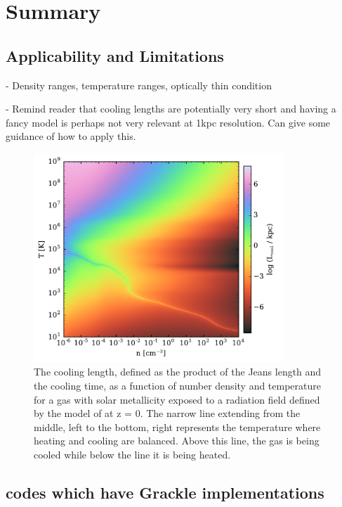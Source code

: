 \section{Summary} \label{sec:summary}

\subsection{Applicability and Limitations}

- Density ranges, temperature ranges, optically thin condition

- Remind reader that cooling lengths are potentially very short and
having a fancy model is perhaps not very relevant at 1kpc
resolution. Can give some guidance of how to apply this.

\begin{figure}
  \centering
  \includegraphics[width=0.84\textwidth]{cooling_length.pdf}
  \caption{
    The cooling length, defined as the product of the Jeans length and
    the cooling time, as a function of number density and temperature
    for a gas with solar metallicity exposed to a radiation field
    defined by the model of \citet{2012ApJ...746..125H} at z = 0.  The
    narrow line extending from the middle, left to the bottom, right
    represents the temperature where heating and cooling are
    balanced.  Above this line, the gas is being cooled while below
    the line it is being heated.
  } \label{fig:cooling-length}
\end{figure}

\subsection{codes which have Grackle implementations}


